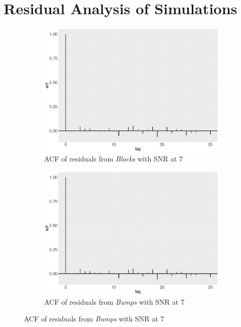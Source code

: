 \section{Residual Analysis of Simulations}
\begin{figure}[!ht]
    \centering
    \begin{subfigure}{0.45\textwidth}
    \centering
    \includegraphics[width=\textwidth]{Chapters/02TractorSplineTheory/plot/ggplot/ggacfBlocks7.pdf}
    \caption{ACF of residuals from \textit{Blocks} with SNR at 7 }
    \end{subfigure}%
    \begin{subfigure}{0.45\textwidth}
    \centering
    \includegraphics[width=\textwidth]{Chapters/02TractorSplineTheory/plot/ggplot/ggacfBumps7.pdf}
    \caption{ACF of residuals from \textit{Bumps} with SNR at 7 }

\end{subfigure}
\end{figure}
